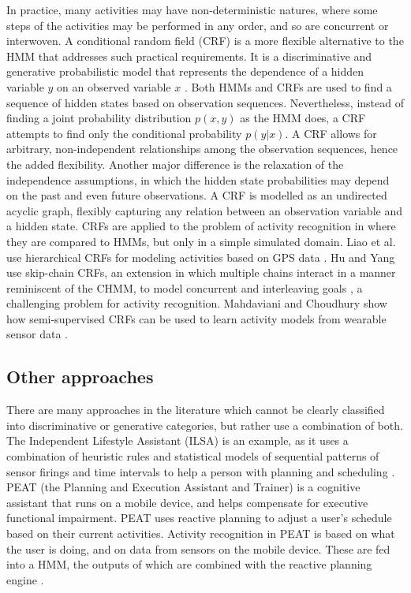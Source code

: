 In practice, many activities may have non-deterministic natures, where some steps of the activities may be performed in any order, and so are concurrent or interwoven. A conditional random field (CRF) is a more flexible alternative to the HMM that addresses such practical requirements. It is a discriminative and generative probabilistic model that represents the dependence of a hidden variable $y$ on an observed variable $x$ \cite{Sutton2007}. Both HMMs and CRFs are used to find a sequence of hidden states based on observation sequences. Nevertheless, instead of finding a joint probability distribution $p(x,y)$ as the HMM does, a CRF attempts to find only the conditional probability $p(y|x)$. A CRF allows for arbitrary, non-independent relationships among the observation sequences, hence the added flexibility. Another major difference is the relaxation of the independence assumptions, in which the hidden state probabilities may depend on the past and even future observations. A CRF is modelled as an undirected acyclic graph, flexibly capturing any relation between an observation variable and a hidden state. CRFs are applied to the problem of activity recognition in \cite{Vail2007} where they are compared to HMMs, but only in a simple simulated domain. Liao et al. use hierarchical CRFs for modeling activities based on GPS data \cite{Liao2007}. Hu and Yang use skip-chain CRFs, an extension in which multiple chains interact in a manner reminiscent of the CHMM, to model concurrent and interleaving goals \cite{Hu2008}, a challenging problem for activity recognition. Mahdaviani and Choudhury show how semi-supervised CRFs can be used to learn activity models from wearable sensor data \cite{Mahdaviani2008}.

\subsection{Other approaches}
\label{subsec:soa:data:other}

There are many approaches in the literature which cannot be clearly classified into discriminative or generative categories, but rather use a combination of both. The Independent Lifestyle Assistant (ILSA) is an example, as it uses a combination of heuristic rules and statistical models of sequential patterns of sensor firings and time intervals to help a person with planning and scheduling \cite{Guralnik2002}. PEAT (the Planning and Execution Assistant and Trainer) is a cognitive assistant that runs on a mobile device, and helps compensate for executive functional impairment. PEAT uses reactive planning to adjust a user’s schedule based on their current activities. Activity recognition in PEAT is based on what the user is doing, and on data from sensors on the mobile device. These are fed into a HMM, the outputs of which are combined with the reactive planning engine \cite{Modayil2008}.

